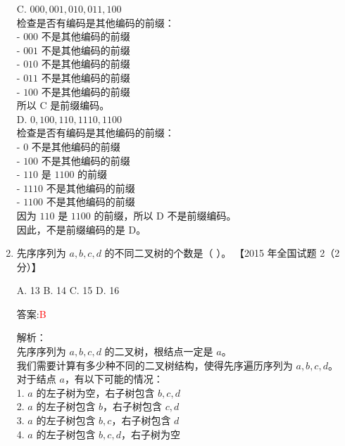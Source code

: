 \documentclass[lang=cn,newtx,10pt,scheme=chinese]{../../../elegantbook}
\begin{document}
\begin{enumerate}
        C. $000, 001, 010, 011, 100$\\
        检查是否有编码是其他编码的前缀：\\
        - $000$ 不是其他编码的前缀\\
        - $001$ 不是其他编码的前缀\\
        - $010$ 不是其他编码的前缀\\
        - $011$ 不是其他编码的前缀\\
        - $100$ 不是其他编码的前缀\\
        所以 C 是前缀编码。\\
        
        D. $0, 100, 110, 1110, 1100$\\
        检查是否有编码是其他编码的前缀：\\
        - $0$ 不是其他编码的前缀\\
        - $100$ 不是其他编码的前缀\\
        - $110$ 是 $1100$ 的前缀\\
        - $1110$ 不是其他编码的前缀\\
        - $1100$ 不是其他编码的前缀\\
        因为 $110$ 是 $1100$ 的前缀，所以 D 不是前缀编码。\\
        
        因此，不是前缀编码的是 D。\\
    
        \item 先序序列为 $a, b, c, d$ 的不同二叉树的个数是（ ）。  
        【2015 年全国试题 2（2 分）】 
    
        A. 13 \quad B. 14 \quad C. 15 \quad D. 16  
    
        答案:\textcolor{red}{B}
        
        解析：\\
        先序序列为 $a, b, c, d$ 的二叉树，根结点一定是 $a$。\\
        
        我们需要计算有多少种不同的二叉树结构，使得先序遍历序列为 $a, b, c, d$。\\
        
        对于结点 $a$，有以下可能的情况：\\
        1. $a$ 的左子树为空，右子树包含 $b, c, d$\\
        2. $a$ 的左子树包含 $b$，右子树包含 $c, d$\\
        3. $a$ 的左子树包含 $b, c$，右子树包含 $d$\\
        4. $a$ 的左子树包含 $b, c, d$，右子树为空\\
        

\end{enumerate}
\end{document}
